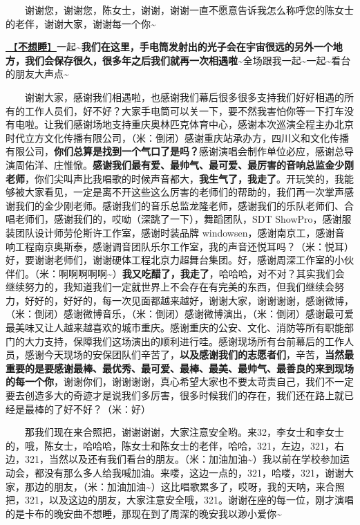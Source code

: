 \documentclass[]{ctexbook}
\begin{document}
  谢谢您，谢谢您，陈女士，谢谢，谢谢一直不愿意告诉我怎么称呼您的陈女士的老伴，谢谢大家，谢谢每一个你\textasciitilde{}

\hyperref[donot-want-to-sleep]{🎵【\textbf{不想睡}】}一起\textasciitilde{}\textbf{我们在这里，手电筒发射出的光子会在宇宙很远的另外一个地方，我们会保存很久，很多年之后我们就再一次相遇啦\textasciitilde{}}全场跟我一起\textasciitilde 一起\textasciitilde 看台的朋友大声点\textasciitilde{}

  谢谢大家，感谢我们相遇啦，也感谢我们幕后很多很多支持我们好好相遇的所有的工作人员们，好不好？大家手电筒可以关一下，要不然我害怕你等一下打车没有电啦。让我们感谢场地支持重庆奥林匹克体育中心，感谢本次巡演全程主办北京时代立方文化传播有限公司，（米：倒闭）感谢重庆站承办方，四川义和文化传播有限公司，\textbf{你们总算是找到一个气口了是吗？}感谢演唱会制作单位必应，感谢总导演周佑洋、庄惟惞。\textbf{感谢我们最有爱、最帅气、最可爱、最厉害的音响总监金少刚老师}，你们尖叫声比我唱歌的时候声音都大，\textbf{我生气了，我走了}。开玩笑的，我能够被大家看见，一定是离不开这些这么厉害的老师们的帮助的，我们再一次掌声感谢我们的金少刚老师。感谢我们的音乐总监龙隆老师，感谢我们的乐队老师们、合唱老师们，感谢我们的，哎呦（深跳了一下），舞蹈团队，SDT ShowPro，感谢服装团队设计师劳伦斯许工作室，感谢时装品牌 windowsen，感谢南京工，感谢音响工程南京奥斯泰，感谢调音团队乐尔工作室，我的声音还悦耳吗？（米：悦耳）好，要谢谢老师们，谢谢硬体工程北京力超舞台集团。好，感谢周深工作室的小伙伴们。（米：啊啊啊啊啊\textasciitilde）\textbf{我又吃醋了，我走了}，哈哈哈，对不对？其实我们会继续努力的，我知道我们一定就世界上不会存在有完美的东西，但我们继续会努力，好好的，好好的，每一次见面都越来越好，谢谢大家，谢谢谢谢，感谢微博，（米：倒闭）感谢微博音乐，（米：倒闭）感谢微博演出，（米：倒闭）感谢最可爱最美味又让人越来越喜欢的城市重庆。感谢重庆的公安、文化、消防等所有职能部门的大力支持，保障我们这场演出的顺利进行哇。感谢现场所有台前幕后的工作人员，感谢今天现场的安保团队们辛苦了，\textbf{以及感谢我们的志愿者们}，辛苦，\textbf{当然最重要的是要感谢最棒、最优秀、最可爱、最棒、最美、最帅气、最善良的来到现场的每一个你}，谢谢你们，谢谢谢谢，真心希望大家也不要太苛责自己，我们不一定要去创造多大的奇迹才是说我们多厉害，很多时候我们的存在，我们还在路上就已经是最棒的了好不好？（米：好）

  那我们现在来合照把，谢谢谢谢，大家注意安全哟。来32，李女士和李女士的，哦，陈女士，哈哈哈，陈女士和陈女士的老伴，哈哈，321，左边，321，右边，321，当然以及还有我们看台的朋友。（米：加油加油\textasciitilde）我以前在学校参加运动会，都没有那么多人给我喊加油。来喽，这边一点的，321，哈喽，321，谢谢大家，那边的朋友，（米：加油加油\textasciitilde）这比唱歌累多了，哎呀，我的天呐，来合照把，321，以及这边的朋友，大家注意安全哦，321。谢谢在座的每一位，刚才演唱的是卡布的晚安曲不想睡，那现在到了周深的晚安我以渺小爱你\textasciitilde{}
\end{document}
